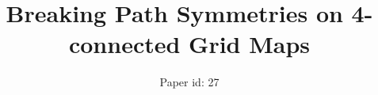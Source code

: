 \documentclass{article}
\begin{document}
\title{Breaking Path Symmetries on 4-connected Grid Maps}
\author{Paper id: 27}


\maketitle




 





%



\end{document}
